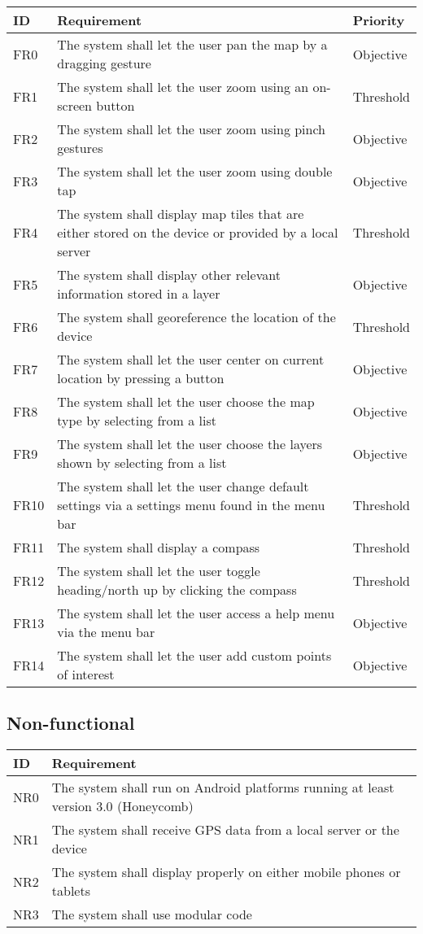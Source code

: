 \documentclass{article}
\begin{document}
\begin{tabular}{ | p{.5in} | p{4.5in} | p{1in}|}
\hline
\textbf{ID} & \textbf{Requirement} & \textbf{Priority}\\
\hline
\hline
FR0 & The system shall let the user pan the map by a dragging gesture & Objective\\
\hline
FR1 & The system shall let the user zoom using an on-screen button & Threshold\\
\hline
FR2 & The system shall let the user zoom using pinch gestures & Objective\\
\hline
FR3 & The system shall let the user zoom using double tap & Objective\\
\hline
FR4 & The system shall display map tiles that are either stored on the device or provided by a local server & Threshold\\
\hline
FR5 & The system shall display other relevant information stored in a layer & Objective\\
\hline
FR6 & The system shall georeference the location of the device & Threshold\\
\hline
FR7 & The system shall let the user center on current location by pressing a button & Objective\\
\hline
FR8 & The system shall let the user choose the map type by selecting from a list & Objective\\
\hline
FR9 & The system shall let the user choose the layers shown by selecting from a list & Objective\\
\hline
FR10 & The system shall let the user change default settings via a settings menu found in the menu bar & Threshold\\
\hline
FR11 & The system shall display a compass & Threshold\\
\hline
FR12 & The system shall let the user toggle heading/north up by clicking the compass & Threshold\\
\hline
FR13 & The system shall let the user access a help menu via the menu bar & Objective\\
\hline
FR14 & The system shall let the user add custom points of interest & Objective\\
\hline
\end{tabular}

\subsection{Non-functional}

\begin{tabular}{ | p{.5in} | p{5in} | }
\hline
\textbf{ID} & \textbf{Requirement}\\
\hline
\hline
NR0 & The system shall run on Android platforms running at least version 3.0 (Honeycomb)\\
\hline
NR1 & The system shall receive GPS data from a local server or the device\\
\hline
NR2 & The system shall display properly on either mobile phones or tablets\\
\hline
NR3 & The system shall use modular code\\
\hline
\end{tabular}
\end{document}
